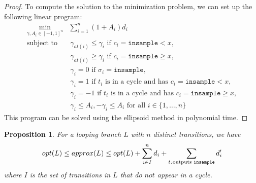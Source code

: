\documentclass[12pt]{article}
\newcommand{\gguard}[1][x]{\texttt{insample}\geq#1}
\newcommand{\lguard}[1][x]{\texttt{insample} < #1}
\newtheorem{prop}[thm]{Proposition}
\theoremstyle{definition}
\begin{document}
\begin{proof}
    To compute the solution to the minimization problem, we can set up the following linear program: 
    \begin{align*}
        \min_{\gamma, A_i \in [-1, 1]^n} &\sum_{i = 1}^n \left(1 + A_i \right) d_i \\ 
            \text{subject to } 
            &\ \gamma_{at(i)} \leq \gamma_i \text{ if } c_i = \lguard, \\
            &\ \gamma_{at(i)} \geq \gamma_i \text{ if } c_i = \gguard, \\
            &\ \gamma_i = 0 \text{ if } \sigma_i = \texttt{insample}, \\
            &\ \gamma_i = 1 \text{ if } t_i \text{ is in a cycle and has } c_i = \lguard,\\ 
            &\ \gamma_i = -1 \text{ if } t_i \text{ is in a cycle and has } c_i = \gguard,\\
            &\ \gamma_i \leq A_i, -\gamma_i \leq A_i \text{ for all } i \in \{1, \dots, n\} 
    \end{align*}
    This program can be solved using the ellipsoid method in polynomial time.
\end{proof}

\begin{prop}
    For a looping branch $L$ with $n$ distinct transitions, we have 
    \[opt(L) \leq approx(L) \leq opt(L) + \sum_{i \in I }^n d_i + \sum_{t_i \text{outputs \texttt{insample}}} d_i'\]
    where $I$ is the set of transitions in $L$ that do $\textit{not}$ appear in a cycle.
\end{prop}
\end{document}
